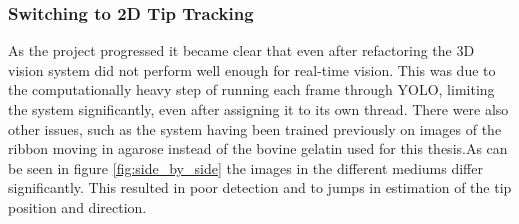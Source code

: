 \subsubsection{Switching to 2D Tip Tracking}
As the project progressed it became clear that even after refactoring the 3D vision system did not perform well enough for real-time vision. This was due to the computationally heavy step of running each frame through YOLO, limiting the system significantly, even after assigning it to its own thread. There were also other issues, such as the system having been trained previously on images of the ribbon moving in agarose instead of the bovine gelatin used for this thesis.As can be seen in figure \ref{fig:side_by_side} the images in the different mediums differ significantly. This resulted in poor detection and to jumps in estimation of the tip position and direction.
